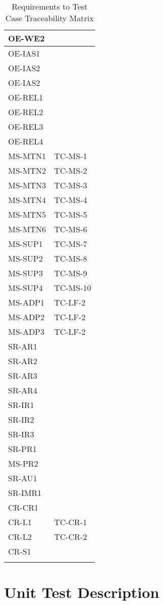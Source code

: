\documentclass[12pt, titlepage]{article}
\begin{document}
\begin{longtable}{|l|l|}
  OE-WE2 & \\ \hline
  OE-IAS1 & \\ \hline
  OE-IAS2 & \\ \hline
  OE-IAS2 & \\ \hline
  OE-REL1 & \\ \hline
  OE-REL2 & \\ \hline
  OE-REL3 & \\ \hline
  OE-REL4 & \\ \hline
  MS-MTN1 & TC-MS-1 \\ \hline
  MS-MTN2 & TC-MS-2 \\ \hline
  MS-MTN3 & TC-MS-3 \\ \hline
  MS-MTN4 & TC-MS-4 \\ \hline
  MS-MTN5 & TC-MS-5 \\ \hline
  MS-MTN6 & TC-MS-6 \\ \hline
  MS-SUP1 & TC-MS-7 \\ \hline
  MS-SUP2 & TC-MS-8 \\ \hline
  MS-SUP3 & TC-MS-9 \\ \hline
  MS-SUP4 & TC-MS-10 \\ \hline
  MS-ADP1 & TC-LF-2 \\ \hline
  MS-ADP2 & TC-LF-2 \\ \hline
  MS-ADP3 & TC-LF-2 \\ \hline
  SR-AR1 & \\ \hline
  SR-AR2 & \\ \hline
  SR-AR3 & \\ \hline
  SR-AR4 & \\ \hline
  SR-IR1 & \\ \hline
  SR-IR2 & \\ \hline
  SR-IR3 & \\ \hline
  SR-PR1 & \\ \hline
  MS-PR2 & \\ \hline
  SR-AU1 & \\ \hline
  SR-IMR1 & \\ \hline
  CR-CR1 & \\ \hline
  CR-L1 & TC-CR-1 \\ \hline
  CR-L2 & TC-CR-2 \\ \hline
  CR-S1 & \\ \hline
  \caption{Requirements to Test Case Traceability Matrix}
\end{longtable}

\section{Unit Test Description}
\end{document}
